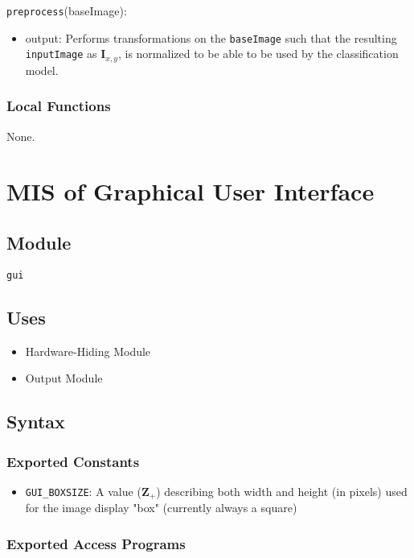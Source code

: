 \documentclass[12pt, titlepage]{article}
\def\code#1{\texttt{#1}}
\begin{document}
\noindent \code{preprocess}(baseImage):
\begin{itemize} 
\item output: Performs transformations on the \code{baseImage} such that the resulting \code{inputImage} 
as $\mathbf{I}_{x,y}$, is normalized to be able to be used by the classification model.
\end{itemize}

\subsubsection{Local Functions}

None.

\section{MIS of Graphical User Interface} \label{ModuleGUI} 

\subsection{Module}

\code{gui}

\subsection{Uses}

\begin{itemize}
  \item Hardware-Hiding Module  
  \item Output Module 
\end{itemize}

\subsection{Syntax}

\subsubsection{Exported Constants}

\begin{itemize}
  \item \code{GUI\_BOXSIZE}: A value ($\mathbf{Z}_{+}$) describing both width and height (in pixels) used for the image
  display "box" (currently always a square)
\end{itemize}

\subsubsection{Exported Access Programs}
\end{document}
